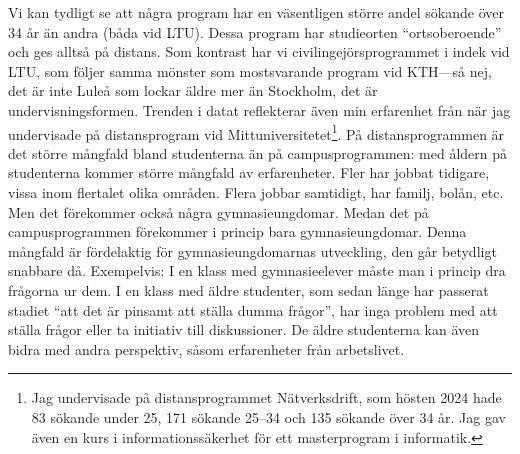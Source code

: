 \documentclass[a4paper,oneside,article,swedish]{memoir}
\begin{document}
Vi kan tydligt se att några program har en väsentligen större andel sökande 
över 34 år än andra (båda vid LTU).
Dessa program har studieorten \enquote{ortsoberoende} och ges alltså på 
distans.
Som kontrast har vi civilingejörsprogrammet i indek vid LTU, som följer samma 
mönster som mostsvarande program vid KTH---så nej, det är inte Luleå som lockar 
äldre mer än Stockholm, det är undervisningsformen.
Trenden i datat reflekterar även min erfarenhet från när jag undervisade på 
distansprogram vid Mittuniversitetet\footnote{%
  Jag undervisade på distansprogrammet Nätverksdrift, som hösten 2024 hade 83 
  sökande under 25, 171 sökande 25--34 och 135 sökande över 34 år.
  Jag gav även en kurs i informationssäkerhet för ett masterprogram i 
  informatik.
}.
På distansprogrammen är det större mångfald bland studenterna än på 
campusprogrammen:
med åldern på studenterna kommer större mångfald av erfarenheter.
Fler har jobbat tidigare, vissa inom flertalet olika områden.
Flera jobbar samtidigt, har familj, bolån, etc.
Men det förekommer också några gymnasieungdomar.
Medan det på campusprogrammen förekommer i princip bara gymnasieungdomar.
Denna mångfald är fördelaktig för gymnasieungdomarnas utveckling, den går 
betydligt snabbare då.
Exempelvis:
I en klass med gymnasieelever måste man i princip dra frågorna ur dem.
I en klass med äldre studenter, som sedan länge har passerat stadiet 
\enquote{att det är pinsamt att ställa dumma frågor}, har inga problem med att 
ställa frågor eller ta initiativ till diskussioner.
De äldre studenterna kan även bidra med andra perspektiv, såsom erfarenheter 
från arbetslivet.
\end{document}
